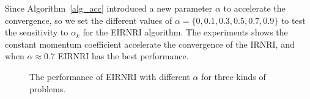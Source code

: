 \documentclass[twoside,11pt]{article}
\numberwithin{equation}{section}
\begin{document}

Since Algorithm~\ref{alg_acc} introduced a new parameter $\alpha$ to accelerate the convergence, 
so we set the different values of $\alpha =\{ 0,0.1,0.3,0.5,0.7,0.9\}$ to test the sensitivity to $\alpha_{k}$ for the EIRNRI algorithm. 
The experiments shows the constant momentum coefficient accelerate the convergence of the IRNRI,  and when $\alpha\approx 0.7$ EIRNRI has the best performance.
\begin{figure}[H]
  \captionsetup{singlelinecheck=off, justification=raggedright}
  \caption{The performance of EIRNRI with different $\alpha$ for three kinds of problems.
  }
  \label{fig_stvAlp}
\end{figure}
\end{document}
